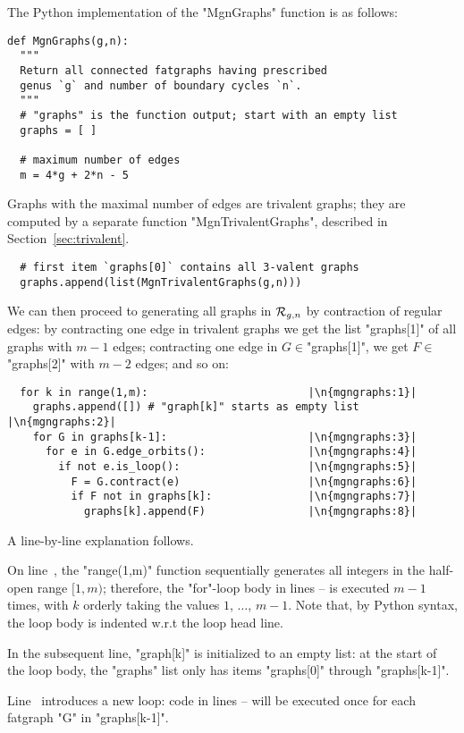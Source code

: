The Python implementation of the "MgnGraphs" function is as follows:
\begin{lstlisting}
def MgnGraphs(g,n):
  """
  Return all connected fatgraphs having prescribed
  genus `g` and number of boundary cycles `n`.
  """
  # "graphs" is the function output; start with an empty list
  graphs = [ ]

  # maximum number of edges
  m = 4*g + 2*n - 5
\end{lstlisting}
Graphs with the maximal number of edges are trivalent graphs; they are
computed by a separate function "MgnTrivalentGraphs", described in
Section~\ref{sec:trivalent}.
\begin{lstlisting}
  # first item `graphs[0]` contains all 3-valent graphs
  graphs.append(list(MgnTrivalentGraphs(g,n)))
\end{lstlisting}
We can then proceed to generating all graphs in $\mathcal{R}_{g,n}$ by
contraction of regular edges: by contracting one edge in
trivalent graphs we get the list "graphs[1]" of all graphs with
$m-1$ edges; contracting one edge in $G \in $"graphs[1]", we
get $F \in $"graphs[2]" with $m-2$ edges; and so on:
\begin{lstlisting}
  for k in range(1,m):                         |\n{mgngraphs:1}|
    graphs.append([]) # "graph[k]" starts as empty list |\n{mgngraphs:2}|
    for G in graphs[k-1]:                      |\n{mgngraphs:3}|
      for e in G.edge_orbits():                |\n{mgngraphs:4}|
        if not e.is_loop():                    |\n{mgngraphs:5}|
          F = G.contract(e)                    |\n{mgngraphs:6}|
          if F not in graphs[k]:               |\n{mgngraphs:7}|
            graphs[k].append(F)                |\n{mgngraphs:8}|
\end{lstlisting}
A line-by-line explanation follows.

On line~, the "range(1,m)" function sequentially
generates all integers in the half-open range $[1, m)$; therefore, the
"for"-loop body in lines -- is
executed $m-1$ times, with $k$ orderly taking the values $1$, $\ldots$,
$m-1$.  Note that, by Python syntax, the loop body is indented w.r.t
the loop head line.

In the subsequent line, "graph[k]" is initialized to an empty list: at
the start of the loop body, the "graphs" list only has items
"graphs[0]" through "graphs[k-1]".

Line~ introduces a new loop: code in lines
-- will be executed once for each
fatgraph "G" in "graphs[k-1]".

